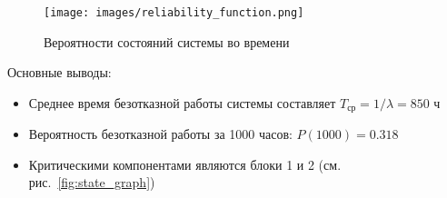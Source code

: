 \begin{figure}[H]
\centering
\texttt{[image: images/reliability\_function.png]}
\caption{Вероятности состояний системы во времени}
\label{fig:reliability_function}
\end{figure}

Основные выводы:
\begin{itemize}
\item Среднее время безотказной работы системы составляет $T_{ср} = 1/\lambda = 850$ ч
\item Вероятность безотказной работы за 1000 часов: $P(1000) = 0.318$
\item Критическими компонентами являются блоки 1 и 2 (см. рис.\ \ref{fig:state_graph})
\end{itemize}
